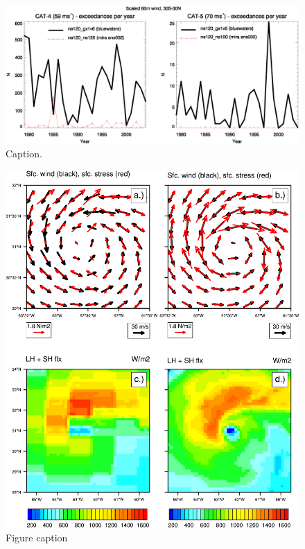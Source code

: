 \documentclass[draft,ms]{AGUTeX}
\begin{document}
\begin{figure}
\includegraphics[width=0.8\linewidth]{fig_Maxwind-exceedance.eps}
\caption{Caption.}
\label{fig:wind-pdfs}
\end{figure}

\begin{figure}
\includegraphics[width=0.8\linewidth]{fig_compareStress.pdf}
\caption{Figure caption}
\label{fig:forecast_panels}
\end{figure}
\end{document}
